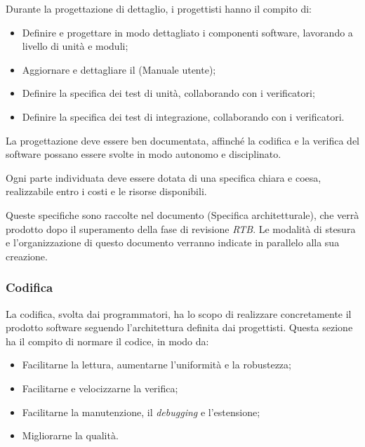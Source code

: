 \documentclass[10pt, a4paper]{article}
\begin{document}
Durante la progettazione di dettaglio, i progettisti hanno il compito di:
\begin{itemize}
    \item Definire e progettare in modo dettagliato i componenti software, lavorando a livello di unità e moduli;
    \item Aggiornare e dettagliare il (Manuale utente);
    \item Definire la specifica dei test di unità, collaborando con i verificatori;
    \item Definire la specifica dei test di integrazione, collaborando con i verificatori.
\end{itemize}

La progettazione deve essere ben documentata, affinché la codifica e la verifica del software possano essere svolte in modo autonomo e disciplinato.

Ogni parte individuata deve essere dotata di una specifica chiara e coesa, realizzabile entro i costi e le risorse disponibili.

Queste specifiche sono raccolte nel documento (Specifica architetturale), che verrà prodotto dopo il superamento della fase di revisione \textit{RTB\pg}.
Le modalità di stesura e l'organizzazione di questo documento verranno indicate in parallelo alla sua creazione.

\subsubsection{Codifica}
La codifica, svolta dai programmatori, ha lo scopo di realizzare concretamente il prodotto software seguendo l'architettura definita dai progettisti.
Questa sezione ha il compito di normare il codice, in modo da:
\begin{itemize}
    \item Facilitarne la lettura, aumentarne l'uniformità e la robustezza;
    \item Facilitarne e velocizzarne la verifica;
    \item Facilitarne la manutenzione, il \textit{debugging\pg} e l'estensione;
    \item Migliorarne la qualità.
\end{itemize}
\end{document}
